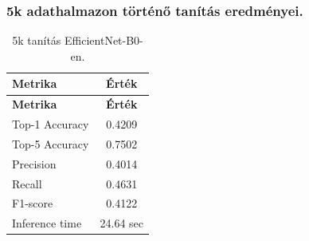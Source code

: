 \subsubsection{5k adathalmazon történő tanítás eredményei.}
  \begin{center}
    \begin{longtable}{l c}
    \caption{5k tanítás EfficientNet-B0-en.} \label{tab:phase03_EfficientNet-B0_5k} \\
    \toprule
    \textbf{Metrika} & \textbf{Érték} \\
    \midrule
    \endfirsthead
    \toprule
    \textbf{Metrika} & \textbf{Érték} \\
    \midrule
    \endhead
    Top-1 Accuracy & 0.4209 \\
    Top-5 Accuracy & 0.7502 \\
    Precision      & 0.4014 \\
    Recall         & 0.4631 \\
    F1-score       & 0.4122 \\
    Inference time & 24.64 sec \\
    \bottomrule
    \end{longtable}
  \end{center}


